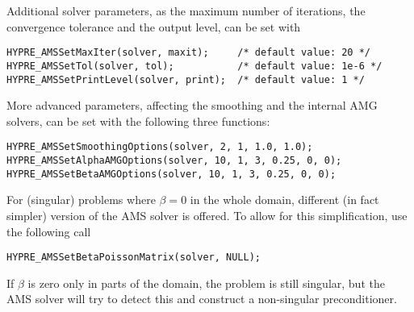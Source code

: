 Additional solver parameters, as the maximum number of iterations,
the convergence tolerance and the output level, can be set with
\begin{display}\begin{verbatim}
HYPRE_AMSSetMaxIter(solver, maxit);     /* default value: 20 */
HYPRE_AMSSetTol(solver, tol);           /* default value: 1e-6 */
HYPRE_AMSSetPrintLevel(solver, print);  /* default value: 1 */
\end{verbatim}\end{display}

More advanced parameters, affecting the smoothing and the
internal AMG solvers, can be set with the following three
functions:
\begin{display}\begin{verbatim}
HYPRE_AMSSetSmoothingOptions(solver, 2, 1, 1.0, 1.0);
HYPRE_AMSSetAlphaAMGOptions(solver, 10, 1, 3, 0.25, 0, 0);
HYPRE_AMSSetBetaAMGOptions(solver, 10, 1, 3, 0.25, 0, 0);
\end{verbatim}\end{display}

For (singular) problems where $\beta = 0$ in the whole domain,
different (in fact simpler) version of the AMS solver is offered.
To allow for this simplification, use the following \hypre{} call
\begin{display}\begin{verbatim}
HYPRE_AMSSetBetaPoissonMatrix(solver, NULL);
\end{verbatim}\end{display}
If $\beta$ is zero only in parts of the domain, the problem is still
singular, but the AMS solver will try to detect this and construct
a non-singular preconditioner.

